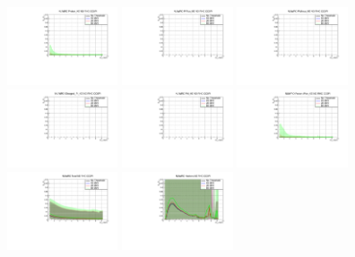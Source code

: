 \begin{center}

  \includegraphics[width=0.245\textwidth]{plots/Elost_profiles/Proton_KE_RHC_CC0Pi.pdf}
  \includegraphics[width=0.245\textwidth]{plots/Elost_profiles/PiPlus_KE_RHC_CC0Pi.pdf}
  \includegraphics[width=0.245\textwidth]{plots/Elost_profiles/PiMinus_KE_RHC_CC0Pi.pdf}
  \includegraphics[width=0.245\textwidth]{plots/Elost_profiles/Charged_Pi_KE_RHC_CC0Pi.pdf}
  \includegraphics[width=0.245\textwidth]{plots/Elost_profiles/Pi0_KE_RHC_CC0Pi.pdf}
  \includegraphics[width=0.245\textwidth]{plots/Elost_profiles/Proton+Pion_KE_RHC_CC0Pi.pdf}
  \includegraphics[width=0.245\textwidth]{plots/Elost_profiles/Total_RHC_CC0Pi.pdf}
  \includegraphics[width=0.245\textwidth]{plots/Elost_profiles/Hadrons_RHC_CC0Pi.pdf}
  
\end{center}

